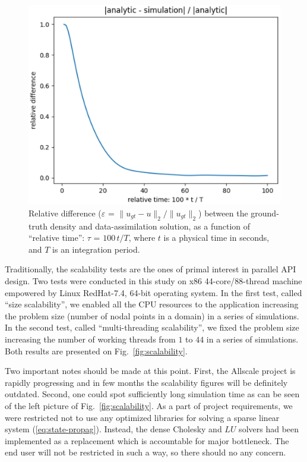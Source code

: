 \documentclass[acmsmall,review,anonymous]{acmart}\settopmatter{printfolios=true,printccs=false,printacmref=false}
\begin{document}
\begin{figure}
\includegraphics[scale=0.5]{images/rel-diff-Nx304-Ny240}
\caption{Relative difference ($\varepsilon$ = $\|u_{gt} - u\|_2 / \|u_{gt}\|_2$) between the ground-truth density and data-assimilation solution, as a function of ``relative time'': $\tau$ = $100\,t / T$, where $t$ is a physical time in seconds, and $T$ is an integration period.}
\label{fig:relerr}
\end{figure}

Traditionally, the scalability tests are the ones of primal interest in parallel API design. Two tests were conducted in this study on x86 44-core/88-thread machine empowered by Linux RedHat-7.4, 64-bit operating system. In the first test, called ``size scalability'', we enabled all the CPU resources to the application increasing the problem size (number of nodal points in a domain) in a series of simulations. In the second test, called ``multi-threading scalability'', we fixed the problem size increasing the number of working threads from $1$ to $44$ in a series of simulations. Both results are presented on Fig.~\ref{fig:scalability}.

Two important notes should be made at this point. First, the Allscale project is rapidly progressing and in few months the scalability figures will be definitely outdated. Second, one could spot sufficiently long simulation time as can be seen of the left picture of Fig.~\ref{fig:scalability}. As a part of project requirements, we were restricted not to use any optimized libraries for solving a sparse linear system (\ref{eq:state-propag}). Instead, the dense Cholesky and $L U$ solvers had been implemented as a replacement which is accountable for major bottleneck. The end user will not be restricted in such a way, so there should no any concern. 
\end{document}
